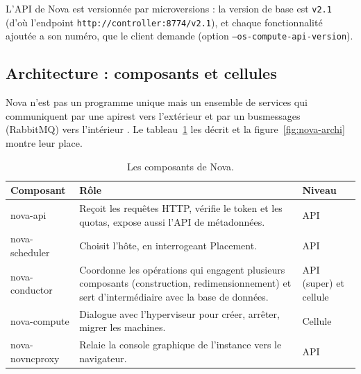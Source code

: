 L'API de Nova est versionnée par \glspl{microversion} : la version de base est \texttt{v2.1} (d'où l'endpoint
\texttt{http://controller:8774/v2.1}), et chaque fonctionnalité ajoutée a son numéro, que le client demande
(option \texttt{--os-compute-api-version}).

\subsection{Architecture : composants et cellules}\label{sec:nova-archi}

Nova n'est pas un programme unique mais un ensemble de services qui communiquent par une \gls{apirest}
vers l'extérieur et par un \gls{busmessages} (RabbitMQ) vers l'intérieur \parencite{nova-architecture}. Le
tableau~\ref{tab:nova-composants} les décrit et la figure~\ref{fig:nova-archi} montre leur place.

\begin{table}[!ht]
\centering
\renewcommand{\arraystretch}{1.3}
\begin{tabular}{@{}>{\raggedright\arraybackslash\ttfamily}p{3.5cm}>{\raggedright\arraybackslash}p{9.0cm}>{\raggedright\arraybackslash}p{3.0cm}@{}}
\toprule
\textrm{\textbf{Composant}} & \textbf{Rôle} & \textbf{Niveau} \\
\midrule
nova-api & Reçoit les requêtes HTTP, vérifie le token et les quotas, expose aussi l'API de métadonnées. & API \\
nova-scheduler & Choisit l'hôte, en interrogeant Placement. & API \\
nova-conductor & Coordonne les opérations qui engagent plusieurs composants (construction, redimensionnement) et sert d'intermédiaire avec la base de données. & API (super) et cellule \\
nova-compute & Dialogue avec l'hyperviseur pour créer, arrêter, migrer les machines. & Cellule \\
nova-novncproxy & Relaie la console graphique de l'instance vers le navigateur. & API \\
\bottomrule
\end{tabular}
\caption{Les composants de Nova.}
\label{tab:nova-composants}
\end{table}

